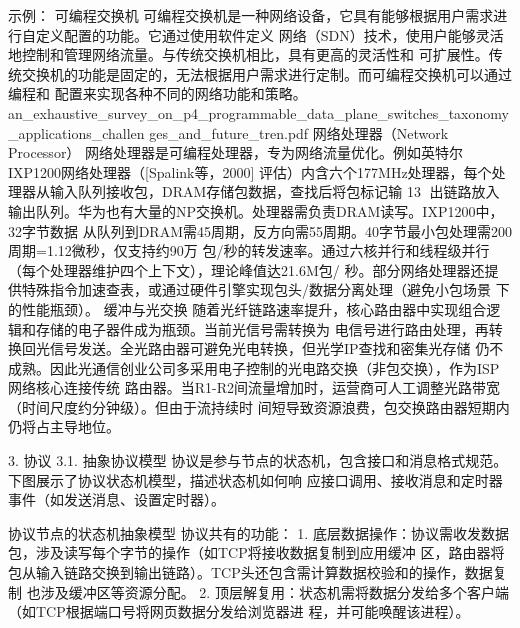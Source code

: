 示例：
可编程交换机
可编程交换机是一种网络设备，它具有能够根据用户需求进行自定义配置的功能。它通过使用软件定义
网络（SDN）技术，使用户能够灵活地控制和管理网络流量。与传统交换机相比，具有更高的灵活性和
可扩展性。传统交换机的功能是固定的，无法根据用户需求进行定制。而可编程交换机可以通过编程和
配置来实现各种不同的网络功能和策略。
📎
an_exhaustive_survey_on_p4_programmable_data_plane_switches_taxonomy_applications_challen
ges_and_future_tren.pdf
网络处理器（Network Processor）
网络处理器是可编程处理器，专为网络流量优化。例如英特尔IXP1200网络处理器（[Spalink等，2000]
评估）内含六个177MHz处理器，每个处理器从输入队列接收包，DRAM存储包数据，查找后将包标记输
                                                                                      13
出链路放入输出队列。华为也有大量的NP交换机。处理器需负责DRAM读写。IXP1200中，32字节数据
从队列到DRAM需45周期，反方向需55周期。40字节最小包处理需200周期=1.12微秒，仅支持约90万
包/秒的转发速率。通过六核并行和线程级并行（每个处理器维护四个上下文），理论峰值达21.6M包/
秒。部分网络处理器还提供特殊指令加速查表，或通过硬件引擎实现包头/数据分离处理（避免小包场景
下的性能瓶颈）。
缓冲与光交换
随着光纤链路速率提升，核心路由器中实现组合逻辑和存储的电子器件成为瓶颈。当前光信号需转换为
电信号进行路由处理，再转换回光信号发送。全光路由器可避免光电转换，但光学IP查找和密集光存储
仍不成熟。因此光通信创业公司多采用电子控制的光电路交换（非包交换），作为ISP网络核心连接传统
路由器。当R1-R2间流量增加时，运营商可人工调整光路带宽（时间尺度约分钟级）。但由于流持续时
间短导致资源浪费，包交换路由器短期内仍将占主导地位。

3.   协议
3.1.   抽象协议模型
协议是参与节点的状态机，包含接口和消息格式规范。下图展示了协议状态机模型，描述状态机如何响
应接口调用、接收消息和定时器事件（如发送消息、设置定时器）。




                   协议节点的状态机抽象模型
协议共有的功能：
 1. 底层数据操作：协议需收发数据包，涉及读写每个字节的操作（如TCP将接收数据复制到应用缓冲
    区，路由器将包从输入链路交换到输出链路）。TCP头还包含需计算数据校验和的操作，数据复制
    也涉及缓冲区等资源分配。
 2. 顶层解复用：状态机需将数据分发给多个客户端（如TCP根据端口号将网页数据分发给浏览器进
    程，并可能唤醒该进程）。


